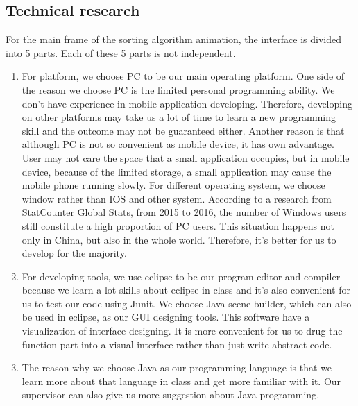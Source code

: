 \documentclass[paper=a4, fontsize=11pt,twoside]{scrartcl}		%
\begin{document}
\subsection{Technical research}
For the main frame of the sorting algorithm animation, the interface is divided into 5 parts. Each of these 5 parts is not independent. 
\begin{enumerate}
	\item For platform, we choose PC to be our main operating platform. One side of the reason we choose PC is the limited personal programming ability. We don’t have experience in mobile application developing. Therefore, developing on other platforms may take us a lot of time to learn a new programming skill and the outcome may not be guaranteed either. Another reason is that although PC is not so convenient as mobile device, it has own advantage. User may not care the space that a small application occupies, but in mobile device, because of the limited storage, a small application may cause the mobile phone running slowly. For different operating system, we choose window rather than IOS and other system. According to a research from StatCounter Global Stats, from 2015 to 2016, the number of Windows users still constitute a high proportion of PC users. This situation happens not only in China, but also in the whole world. Therefore, it’s better for us to develop for the majority.
	\item For developing tools, we use eclipse to be our program editor and compiler because we learn a lot skills about eclipse in class and it’s also convenient for us to test our code using Junit. We choose Java scene builder, which can also be used in eclipse, as our GUI designing tools. This software have a visualization of interface designing. It is more convenient for us to drug the function part into a visual interface rather than just write abstract code. 
	\item The reason why we choose Java as our programming language is that we learn more about that language in class and get more familiar with it. Our supervisor can also give us more suggestion about Java programming. 
	
\end{enumerate}


\end{document}
